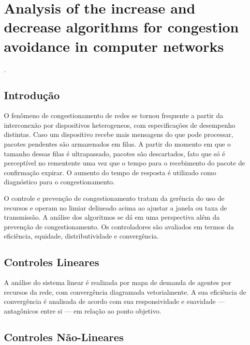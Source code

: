 

\chapter{Analysis of the increase and decrease algorithms for congestion avoidance in computer networks}
 \cite{chiu1989analysis}.


\section*{Introdução}

O fenômeno de congestionamento de redes se tornou frequente a partir da 
interconexão por dispositivos heterogeneos, com especificações de desempenho 
distintas. Caso um dispositivo recebe mais mensagens do que pode processar, 
pacotes pendentes são armazenados em filas. A partir do momento em que o 
tamanho dessas filas é ultrapassado, pacotes são descartados, fato que só é 
perceptível no rementente uma vez que o tempo para o recebimento do pacote de 
confirmação expirar. O aumento do tempo de resposta é utilizado como 
diagnóstico para o congestionamento.

O controle e prevenção de congestionamento tratam da gerência do uso de 
recursos e operam no limiar delineado acima ao ajustar a janela ou taxa de 
transmissão. A análise dos algoritmos se dá em uma perspectiva além da 
prevenção de congestionamento. Os controladores são avaliados em termos da 
eficiência, equidade, distributividade e convergência.


\section*{Controles Lineares}

A análise do sistema linear é realizada por mapa de demanda de agentes por 
recursos da rede, com convergência diagramada vetorialmente. A sua eficiência de 
convergência é analisada de acordo com sua responsividade e suavidade --- 
antagônicos entre si --- em relação ao ponto objetivo.


\section*{Controles Não-Lineares}

